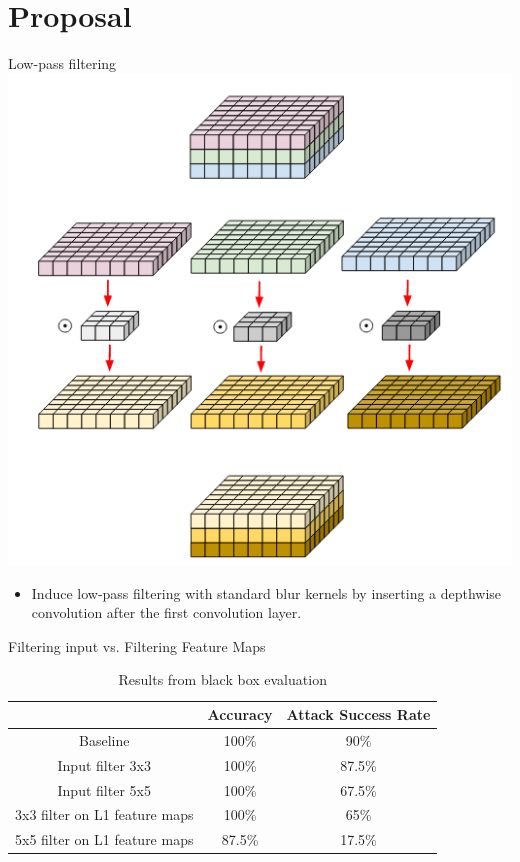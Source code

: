 \documentclass{beamer}
\begin{document}
\section{Proposal}
\begin{frame}{Low-pass filtering}
	\centering
	\includegraphics[scale=0.3]{depthwise_conv.png}
	\begin{itemize}
		\item Induce low-pass filtering with standard blur kernels by inserting a depthwise convolution after the first convolution layer.
	\end{itemize}
\end{frame}
\begin{frame}{Filtering input vs. Filtering Feature Maps}
\begin{table}[h!]
  \begin{center}
    \caption{Results from black box evaluation}
    \label{tab:transfer}
    \begin{tabular}{c|c|c} %
      & \textbf{Accuracy} & \textbf{Attack Success Rate}\\
      \hline
      Baseline & 100\% & 90\%\\
      Input filter 3x3 & 100\% & 87.5\%\\
      Input filter 5x5 & 100\% & 67.5\%\\
      3x3 filter on L1 feature maps & 100\% & 65\%\\
      5x5 filter on L1 feature maps & 87.5\% & 17.5\%\\
    \end{tabular}
  \end{center}
\end{table}
\end{frame}
\end{document}
